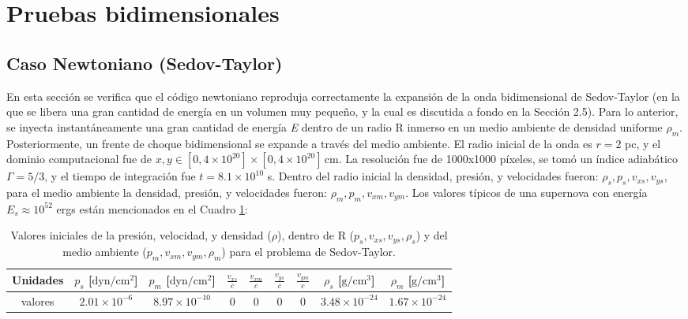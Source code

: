 \documentclass[12pt,a4paper]{book}
\begin{document}


\section{Pruebas bidimensionales}

\subsection{Caso Newtoniano (Sedov-Taylor)}\label{subsec:caso_newtoniano_2d}

En esta sección se verifica que el código newtoniano reproduja correctamente la expansión de la onda bidimensional de Sedov-Taylor (en la que se libera una gran cantidad de energía en un volumen muy pequeño, 
y la cual es discutida a fondo en la Sección 2.5). Para lo anterior, se inyecta instantáneamente una gran cantidad de energía \emph{E} dentro de un radio R inmerso en un medio ambiente de densidad uniforme $\rho_m$. 
Posteriormente, un frente de choque bidimensional se expande a través del medio ambiente. El radio inicial de la onda es $r = 2$ pc, y el dominio computacional fue de 
$x, y \in [0,4 \times 10^{20}]\times[0,4 \times 10^{20}] \, \text{cm}$. La resolución fue de 1000x1000 píxeles, se tomó un índice adiabático $\Gamma = 5/3$, y el tiempo de integración 
fue $t = 8.1 \times 10^{10}$ s. Dentro del radio inicial la densidad, presión, y velocidades fueron: $\rho_s, p_s, v_{xs}, v_{ys}$, para el medio ambiente la densidad, presión, y velocidades fueron: 
$\rho_m, p_m, v_{xm}, v_{ym}$. Los valores típicos de una supernova con energía $E_{s}  \approx 10^{52}$ ergs están mencionados en el Cuadro \ref{Cuadro_parametros_choque_2D_newtoniano}:

\begin{table}[htbp]
  \begin{center}
  \begin{tabular}{|c|c|c|c|c|c|c|c|c|}
  \hline 
  \textbf{Unidades} & \textbf{$p_s$} [$\text{dyn}/\text{cm}^2$] & 
  \textbf{$p_m$} [$\text{dyn}/\text{cm}^2$] & 
  $\frac{v_{xs}}{c}$ & $\frac{v_{xm}}{c}$  & $\frac{v_{ys}}{c}$ & $\frac{v_{ym}}{c}$  & 
  \textbf{$\rho_s$} [$\text{g}/\text{cm}^3$]& 
  \textbf{$\rho_m$} [$\text{g}/\text{cm}^3$]\\ 
  \hline 
  valores & $2.01 \times 10^{-6}$ & $8.97 \times 10^{-10}$  & 0 & 0 & 0 & 0 &  $3.48 \times 10^{-24}$  & $1.67 \times 10^{-24}$ \\ 
  \hline 
  \end{tabular}
  \caption{\label{Cuadro_parametros_choque_2D_newtoniano} Valores iniciales 
  de la presión, velocidad, y densidad ($\rho$), dentro de R ($p_s, v_{xs}, v_{ys}, \rho_s$) y del medio ambiente ($p_m, v_{xm}, v_{ym}, \rho_m$) para el problema de Sedov-Taylor.}
  \end{center}
\end{table}
\end{document}
